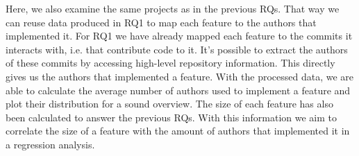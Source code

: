 Here, we also examine the same projects as in the previous RQs.
That way we can reuse data produced in RQ1 to map each feature to the authors that implemented it.
For RQ1 we have already mapped each feature to the commits it interacts with, i.e. that contribute code to it.
It's possible to extract the authors of these commits by accessing high-level repository information.
This directly gives us the authors that implemented a feature.
With the processed data, we are able to calculate the average number of authors used to implement a feature and plot their distribution for a sound overview.
The size of each feature has also been calculated to answer the previous RQs.
With this information we aim to correlate the size of a feature with the amount of authors that implemented it in a regression analysis.
